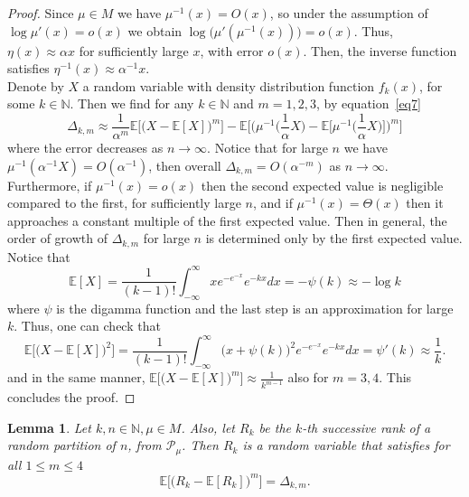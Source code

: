 \documentclass[pdflatex,sn-mathphys-num]{sn-jnl}%
\theoremstyle{thmstyleone}%
\theoremstyle{thmstyletwo}%
\theoremstyle{thmstylethree}%
\theoremstyle{thmstylethree}%
\newtheorem{lemma}{Lemma}%
\theoremstyle{thmstylethree}%
\begin{document}
\begin{proof}
    Since $\mu\in M$ we have $\mu^{-1}(x)=O(x)$, so under the assumption of $\log\mu'(x)=o(x)$ we obtain $\log\big(\mu'(\mu^{-1}(x))\big)=o(x)$. Thus, $\eta(x)\approx \alpha x$ for sufficiently large $x$, with error $o(x)$. Then, the inverse function satisfies $\eta^{-1}(x)\approx\alpha^{-1}x$. \\
    Denote by $X$ a random variable with density distribution function $f_k(x)$, for some $k\in\mathbb{N}$. Then we find for any $k\in\mathbb{N}$ and $m=1,2,3$, by equation~\eqref{eq7}
    \begin{equation*}
        \Delta_{k,m}\approx\frac{1}{\alpha^m}\mathbb{E}\Big[\big(X-\mathbb{E}[X]\big)^m\Big]-\mathbb{E}\Bigg[\bigg(\mu^{-1}\Big(\frac{1}{\alpha}X\Big)-\mathbb{E}\Big[\mu^{-1}\Big(\frac{1}{\alpha}X\Big)\Big]\bigg)^m\Bigg]
    \end{equation*}
    where the error decreases as $n\to\infty$. Notice that for large $n$ we have $\mu^{-1}(\alpha^{-1}X)=O(\alpha^{-1})$, then overall $\Delta_{k,m}=O(\alpha^{-m})$ as $n\to\infty$. Furthermore, if $\mu^{-1}(x)=o(x)$ then the second expected value is negligible compared to the first, for sufficiently large $n$, and if $\mu^{-1}(x)=\Theta(x)$ then it approaches a constant multiple of the first expected value. Then in general, the order of growth of $\Delta_{k,m}$ for large $n$ is determined only by the first expected value. Notice that
    \begin{equation*}
        \mathbb{E}[X]=\frac{1}{(k-1)!}\int_{-\infty}^\infty xe^{-e^{-x}}e^{-kx}dx=-\psi(k)\approx-\log k
    \end{equation*}
    where $\psi$ is the digamma function and the last step is an approximation for large $k$. Thus, one can check that
    \begin{equation*}
        \mathbb{E}\Big[\big(X-\mathbb{E}[X]\big)^2\Big]=\frac{1}{(k-1)!}\int_{-\infty}^\infty\big(x+\psi(k)\big)^2e^{-e^{-x}}e^{-kx}dx=\psi'(k)\approx\frac{1}{k}.
    \end{equation*}
    and in the same manner, $\mathbb{E}\Big[\big(X-\mathbb{E}[X]\big)^m\Big]\approx\frac{1}{k^{m-1}}$ also for $m=3,4$. This concludes the proof.
\end{proof}
\begin{lemma}\label{lemma4}
    Let $k,n\in\mathbb{N}, \mu\in M$. Also, let $R_k$ be the $k$-th successive rank of a random partition of $n$, from $\mathcal{P}_\mu$. Then $R_k$ is a random variable that satisfies for all $1\le m\le4$
    \begin{equation}\label{eq9}
        \mathbb{E}\Big[\big(R_k-\mathbb{E}[R_k]\big)^m\Big]=\Delta_{k,m}.
    \end{equation}
\end{lemma}
\end{document}
